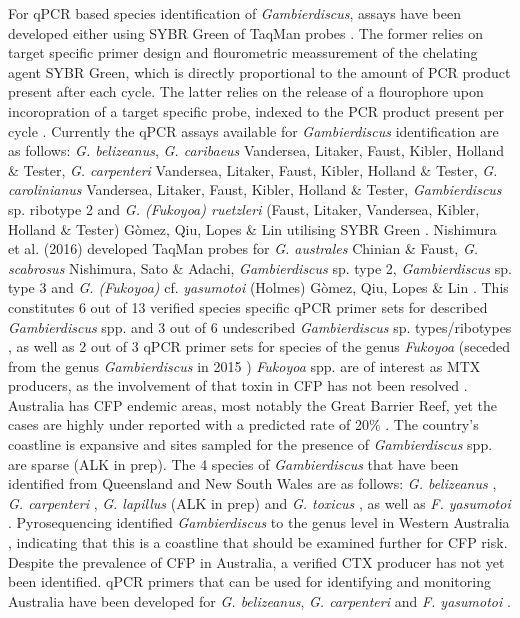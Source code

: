 \documentclass[12pt]{article}
\begin{document}
For qPCR based species identification of \emph{Gambierdiscus}, assays have been developed either using SYBR Green of TaqMan probes \cite{vandersea2012development,nishimura2016quantitative}. The former relies on target specific primer design and flourometric meassurement of the chelating agent SYBR Green, which is directly proportional to the amount of PCR product present after each cycle. The latter relies on the release of a flourophore upon incoropration of a target specific probe, indexed to the PCR product present per cycle \citep{smith2009advantages}. Currently the qPCR assays available for \emph{Gambierdiscus} identification are as follows: \emph{G. belizeanus}, \emph{G. caribaeus} Vandersea, Litaker, Faust, Kibler, Holland \& Tester, \emph{G. carpenteri} Vandersea, Litaker, Faust, Kibler, Holland \& Tester, \emph{G. carolinianus} Vandersea, Litaker, Faust, Kibler, Holland \& Tester, \emph{Gambierdiscus} sp. ribotype 2 and \emph{G. (Fukoyoa) ruetzleri} (Faust, Litaker, Vandersea, Kibler, Holland \& Tester) G\`omez, Qiu, Lopes \& Lin utilising SYBR Green \citep{vandersea2012development}. Nishimura et al. (2016) developed TaqMan probes for \emph{G. australes} Chinian \& Faust, \emph{G. scabrosus} Nishimura, Sato \& Adachi, \emph{Gambierdiscus} sp. type 2, \emph{Gambierdiscus} sp. type 3 and \emph{G. (Fukoyoa)} cf. \emph{yasumotoi} (Holmes) G\`omez, Qiu, Lopes \& Lin \citep{nishimura2016quantitative}. This constitutes 6 out of 13 verified species specific qPCR primer sets for described \emph{Gambierdiscus} spp. and 3 out of 6 undescribed \emph{Gambierdiscus} sp. types/ribotypes , as well as 2 out of 3 qPCR primer sets for species of the genus \emph{Fukoyoa} (seceded from the genus \emph{Gambierdiscus} in 2015 \citep{gomez2015fukuyoa}) \textit{Fukoyoa} spp. are of interest as MTX producers, as the involvement of that toxin in CFP has not been resolved \citep{kohli2014feeding}. \\

Australia has CFP endemic areas, most notably the Great Barrier Reef, yet the cases are highly under reported with a predicted rate of 20\% \citep{lewis2006ciguatera}. The country's coastline is expansive and sites sampled for the presence of \emph{Gambierdiscus} spp. are sparse (ALK in prep). The 4 species of \emph{Gambierdiscus} that have been identified from Queensland and New South Wales are as follows: \emph{G. belizeanus} \citep{murray2014molecular}, \emph{G. carpenteri} \citep{kohli2014high}, \emph{G. lapillus} (ALK in prep) and \emph{G. toxicus} \citep{hallegraeff2010algae}, as well as \emph{F. yasumotoi} \citep{murray2014molecular}. Pyrosequencing identified \emph{Gambierdiscus} to the genus level in Western Australia \citep{kohli2014cob} , indicating that this is a coastline that should be examined further for CFP risk. Despite the prevalence of CFP in Australia, a verified CTX producer has not yet been identified.
qPCR primers that can be used for identifying and monitoring Australia have been developed for \emph{G. belizeanus}, \emph{G. carpenteri} and \emph{F. yasumotoi} \citep{nishimura2016quantitative,vandersea2012development}. \\ 
\end{document}
